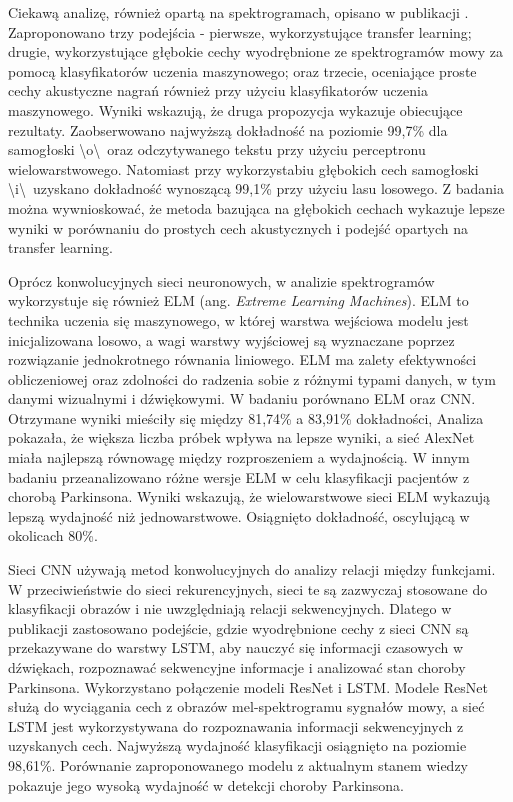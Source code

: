 Ciekawą analizę, również opartą na spektrogramach, opisano w publikacji \cite{8999815}.
Zaproponowano trzy podejścia - pierwsze, wykorzystujące transfer learning; drugie, wykorzystujące głębokie cechy wyodrębnione ze
spektrogramów mowy za pomocą klasyfikatorów uczenia maszynowego; oraz trzecie, oceniające
proste cechy akustyczne nagrań również przy użyciu klasyfikatorów uczenia maszynowego.
Wyniki wskazują, że druga propozycja wykazuje obiecujące rezultaty.
Zaobserwowano najwyższą dokładność na poziomie 99,7\% dla samogłoski \textbackslash o\textbackslash\ oraz odczytywanego tekstu przy użyciu perceptronu wielowarstwowego.
Natomiast przy wykorzystabiu głębokich cech samogłoski \textbackslash i\textbackslash\ uzyskano dokładność wynoszącą 99,1\% przy użyciu lasu losowego.
Z badania można wywnioskować, że metoda bazująca na głębokich cechach wykazuje lepsze wyniki w porównaniu do prostych cech akustycznych i
podejść opartych na transfer learning.

Oprócz konwolucyjnych sieci neuronowych, w analizie spektrogramów wykorzystuje się również ELM (ang. \emph{Extreme Learning Machines}).
ELM to technika uczenia się maszynowego, w której warstwa wejściowa modelu jest inicjalizowana losowo, a wagi warstwy wyjściowej są wyznaczane
poprzez rozwiązanie jednokrotnego równania liniowego. ELM ma zalety efektywności obliczeniowej oraz zdolności do radzenia sobie z różnymi typami danych,
w tym danymi wizualnymi i dźwiękowymi.
W badaniu \cite{GUATELLI2023106700} porównano ELM oraz CNN.
Otrzymane wyniki mieściły się między 81,74\% a 83,91\% dokładności,
Analiza pokazała, że większa liczba próbek wpływa na lepsze wyniki, a sieć AlexNet miała najlepszą równowagę między rozproszeniem a wydajnością.
W innym badaniu \cite{Gelvez-Almeida_2022} przeanalizowano różne wersje ELM w celu klasyfikacji pacjentów z chorobą Parkinsona.
Wyniki wskazują, że wielowarstwowe sieci ELM wykazują lepszą wydajność niż jednowarstwowe.
Osiągnięto dokładność, oscylującą w okolicach 80\%.

Sieci CNN używają metod konwolucyjnych do analizy relacji między funkcjami.
W przeciwieństwie do sieci rekurencyjnych, sieci te są zazwyczaj stosowane do klasyfikacji obrazów i nie uwzględniają relacji sekwencyjnych.
Dlatego w publikacji \cite{ER2021103006}  zastosowano podejście, gdzie wyodrębnione cechy z sieci CNN są przekazywane do warstwy LSTM, aby nauczyć się
informacji czasowych w dźwiękach, rozpoznawać sekwencyjne informacje i analizować stan choroby Parkinsona.
Wykorzystano połączenie modeli ResNet i LSTM.
Modele ResNet służą do wyciągania cech z obrazów mel-spektrogramu sygnałów mowy, a
sieć LSTM jest wykorzystywana do rozpoznawania informacji sekwencyjnych z uzyskanych cech.
Najwyższą wydajność klasyfikacji osiągnięto na poziomie 98,61\%.
Porównanie zaproponowanego modelu z aktualnym stanem wiedzy pokazuje jego wysoką wydajność w detekcji choroby Parkinsona.

